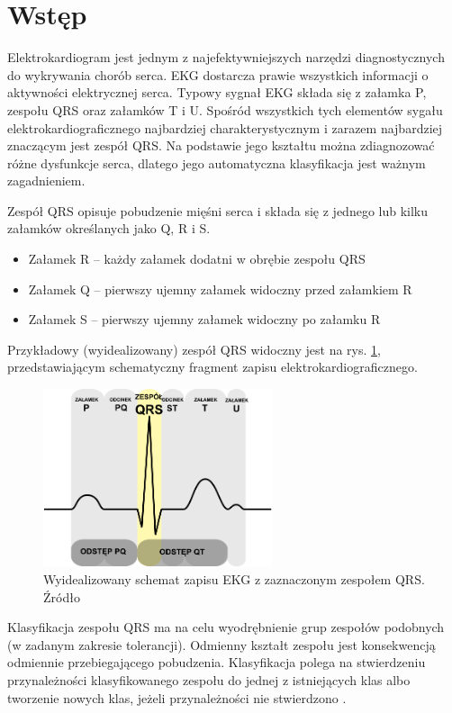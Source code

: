 \section{Wstęp}

\qquad Elektrokardiogram jest jednym z najefektywniejszych narzędzi diagnostycznych do wykrywania chorób serca. EKG dostarcza prawie wszystkich informacji o aktywności elektrycznej serca. Typowy sygnał EKG składa się z załamka P, zespołu QRS oraz załamków T i U. Spośród wszystkich tych elementów sygału elektrokardiograficznego najbardziej charakterystycznym i zarazem najbardziej znaczącym jest zespół QRS. Na podstawie jego kształtu można zdiagnozować różne dysfunkcje serca, dlatego jego automatyczna klasyfikacja jest ważnym zagadnieniem.

Zespół QRS opisuje pobudzenie mięśni serca i składa się z jednego lub kilku załamków określanych jako Q, R i S.
\begin{itemize}
	\item Załamek R – każdy załamek dodatni w obrębie zespołu QRS
	\item Załamek Q – pierwszy ujemny załamek widoczny przed załamkiem R
	\item Załamek S – pierwszy ujemny załamek widoczny po załamku R
\end{itemize}

Przykładowy (wyidealizowany) zespół QRS widoczny jest na rys. \ref{fig:QRSComplex}, przedstawiającym schematyczny fragment zapisu elektrokardiograficznego.


\begin{figure}[h]
	\centering
	\includegraphics[width=0.6\textwidth]{Grafika/ZespolQRS}
	\caption{Wyidealizowany schemat zapisu EKG z zaznaczonym zespołem QRS. Źródło  \cite{QRSComplexWiki}}
	\label{fig:QRSComplex}
\end{figure}


Klasyfikacja zespołu QRS ma na celu wyodrębnienie grup zespołów podobnych (w zadanym zakresie tolerancji). Odmienny kształt zespołu jest konsekwencją odmiennie przebiegającego pobudzenia. Klasyfikacja polega na stwierdzeniu przynależności klasyfikowanego zespołu do jednej z istniejących klas albo tworzenie nowych klas, jeżeli przynależności nie stwierdzono \cite{Augustyniak}.

